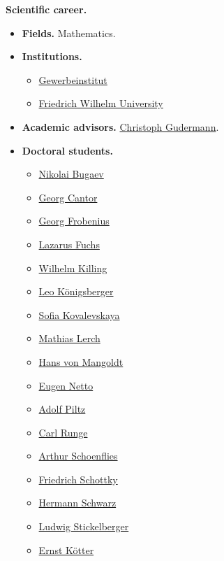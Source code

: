 \documentclass{book}
\numberwithin{equation}{section}
\begin{document}
\textbf{Scientific career.}
\begin{itemize}
    \item \textbf{Fields.} Mathematics.
    \item \textbf{Institutions.}
    \begin{itemize}
        \item \href{https://en.wikipedia.org/wiki/Technical_University_of_Berlin}{Gewerbeinstitut}
        \item \href{https://en.wikipedia.org/wiki/Humboldt_University_of_Berlin}{Friedrich Wilhelm University}
    \end{itemize}
    \item \textbf{Academic advisors.} \href{https://en.wikipedia.org/wiki/Christoph_Gudermann}{Christoph Gudermann}.
    \item \textbf{Doctoral students.}
    \begin{itemize}
        \item \href{https://en.wikipedia.org/wiki/Nikolai_Bugaev}{Nikolai Bugaev}
        \item \href{https://en.wikipedia.org/wiki/Georg_Cantor}{Georg Cantor}
        \item \href{https://en.wikipedia.org/wiki/Georg_Frobenius}{Georg Frobenius}
        \item \href{https://en.wikipedia.org/wiki/Lazarus_Fuchs}{Lazarus Fuchs}
        \item \href{https://en.wikipedia.org/wiki/Wilhelm_Killing}{Wilhelm Killing}
        \item \href{https://en.wikipedia.org/wiki/Leo_K%C3%B6nigsberger}{Leo Königsberger}
        \item \href{https://en.wikipedia.org/wiki/Sofia_Kovalevskaya}{Sofia Kovalevskaya}
        \item \href{https://en.wikipedia.org/wiki/Mathias_Lerch}{Mathias Lerch}
        \item \href{https://en.wikipedia.org/wiki/Hans_von_Mangoldt}{Hans von Mangoldt}
        \item \href{https://en.wikipedia.org/wiki/Eugen_Netto}{Eugen Netto}
        \item \href{https://en.wikipedia.org/wiki/Adolf_Piltz}{Adolf Piltz}
        \item \href{https://en.wikipedia.org/wiki/Carl_Runge}{Carl Runge}
        \item \href{https://en.wikipedia.org/wiki/Arthur_Schoenflies}{Arthur Schoenflies}
        \item \href{https://en.wikipedia.org/wiki/Friedrich_Schottky}{Friedrich Schottky}
        \item \href{https://en.wikipedia.org/wiki/Hermann_Schwarz}{Hermann Schwarz}
        \item \href{https://en.wikipedia.org/wiki/Ludwig_Stickelberger}{Ludwig Stickelberger}
        \item \href{https://en.wikipedia.org/wiki/Ernst_K%C3%B6tter}{Ernst Kötter}
    \end{itemize}
\end{itemize}
\end{document}
